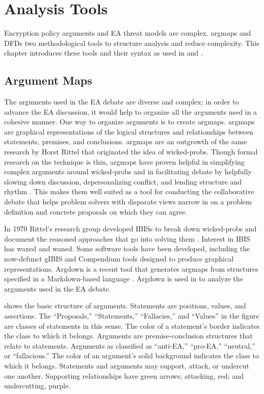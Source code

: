 \chapter{Analysis Tools}
\label{chap-tools}

Encryption policy arguments and \acl{EA} threat models are complex. \Acp{argmap} and \aclp{DFD} two methodological tools
to structure analysis and reduce complexity. This chapter introduces these tools and their syntax as used in
 and .


\section{Argument Maps}
\label{sec-arg-maps-intro}

The arguments used in the \ac{EA} debate are diverse and complex; in order to advance the \ac{EA} discussion, it would
help to organize all the arguments used in a cohesive manner. One way to organize arguments is to create \acp{argmap}.
\Acp{argmap} are graphical representations of the logical structures and relationships between statements, premises, and
conclusions. \Acp{argmap} are an outgrowth of the same research by Horst Rittel that originated the idea of
\acp{wicked-prob}. Though formal research on the technique is thin, \acp{argmap} have proven helpful in simplifying
complex arguments around \acp{wicked-prob} \cite{renton_2007} and in facilitating debate by helpfully slowing down
discussion, depersonalizing conflict, and lending structure and rhythm \cite{dutoit_hypermedia_2006}. This makes them
well suited as a tool for conducting the collaborative debate that helps problem solvers with disparate views narrow in
on a problem definition and concrete proposals on which they can agree.

In 1970 Rittel's research group developed \acp{IBIS} to break down \acp{wicked-prob} and document the reasoned
approaches that go into solving them \cite{kunz_issues_1970}. Interest in \ac{IBIS} has waxed and waned. Some software
tools have been developed, including the now-defunct gIBIS \cite{conklin_gibis_1988} and Compendium
\cite{dutoit_hypermedia_2006} tools designed to produce graphical representations. Argdown is a recent tool that
generates \acp{argmap} from structures specified in a Markdown-based language \cite{voigt_argdown_2018}. Argdown is used
in  to analyze the arguments used in the \ac{EA} debate.

 shows the basic structure of arguments. Statements are positions, values, and assertions. The
``Proposals,'' ``Statements,'' ``Fallacies,'' and ``Values'' in the figure are classes of statements in this sense. The
color of a statement's border indicates the class to which it belongs. Arguments are premise-conclusion structures that
relate to statements. Arguments as classified as ``anti-EA,'' ``pro-EA,'' ``neutral,'' or ``fallacious.'' The color of
an argument's solid background indicates the class to which it belongs. Statements and arguments may support, attack, or
undercut one another. Supporting relationships have green arrows; attacking, red; and undercutting, purple.


